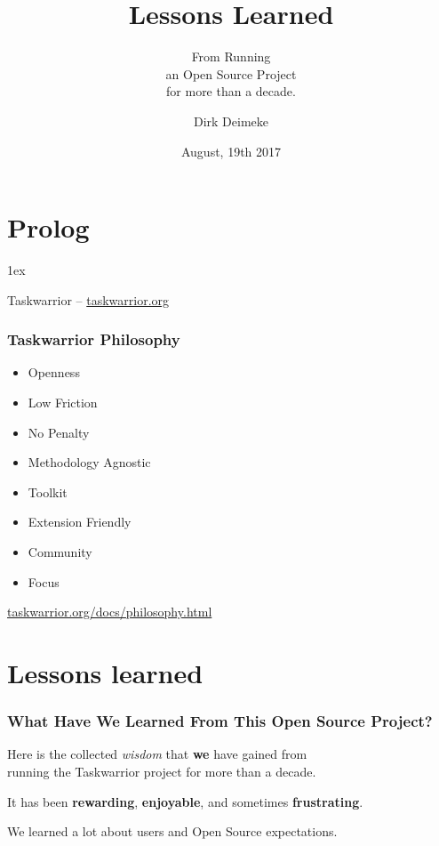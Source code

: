 \documentclass[t,handout,aspectratio=169]{beamer}
\title{Lessons Learned}
\subtitle{From Running \\ an Open Source Project \\ for more than a decade.}
\date{August, 19th 2017}
\author{Dirk Deimeke}
\institute{Taskwarrior Academy @ FrOSCon}
\begin{document}
\begin{frame}
    \titlepage
\end{frame}

\section{Prolog}

\parskip1ex

\begin{frame}[standout]
    Taskwarrior -- \href{https://taskwarrior.org/}{taskwarrior.org}
\end{frame}

\begin{frame}[fragile]\frametitle{Taskwarrior Philosophy}
    \vfill
    \begin{itemize}
        \item Openness
        \item Low Friction
        \item No Penalty
        \item Methodology Agnostic
        \item Toolkit
        \item Extension Friendly
        \item Community
        \item Focus
    \end{itemize}

    \href{https://taskwarrior.org/docs/philosophy.html}{taskwarrior.org/docs/philosophy.html}
\end{frame}

\section{Lessons learned}

\begin{frame}[fragile]\frametitle{What Have We Learned From This Open Source Project?}
    \vfill
    Here is the collected \textit{wisdom} that \textbf{we} have gained from \\
    running the Taskwarrior project for more than a decade. \pause

    It has been \textbf{rewarding}, \textbf{enjoyable}, and sometimes \textbf{frustrating}. \pause

    We learned a lot about users and Open Source expectations.
\end{frame}
\end{document}
